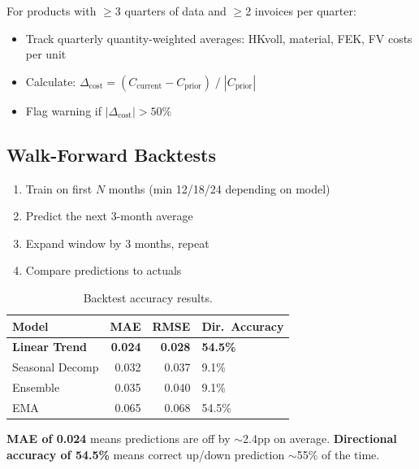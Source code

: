 \documentclass[11pt,a4paper]{article}
\newcommand{\pp}{pp}
\begin{document}
For products with $\geq$3 quarters of data and $\geq$2 invoices per quarter:
\begin{itemize}[nosep]
  \item Track quarterly quantity-weighted averages: HKvoll, material, FEK, FV costs per unit
  \item Calculate: $\Delta_{\text{cost}} = (C_{\text{current}} - C_{\text{prior}}) \;/\; |C_{\text{prior}}|$
  \item Flag warning if $|\Delta_{\text{cost}}| > 50\%$
\end{itemize}

\subsection{Walk-Forward Backtests}

\begin{enumerate}[nosep]
  \item Train on first $N$ months (min 12/18/24 depending on model)
  \item Predict the next 3-month average
  \item Expand window by 3 months, repeat
  \item Compare predictions to actuals
\end{enumerate}

\begin{table}[H]
\centering
\begin{tabular}{lrrl}
\toprule
\textbf{Model} & \textbf{MAE} & \textbf{RMSE} & \textbf{Dir.\ Accuracy} \\
\midrule
\textbf{Linear Trend} & \textbf{0.024} & \textbf{0.028} & \textbf{54.5\%} \\
Seasonal Decomp       & 0.032          & 0.037          & 9.1\% \\
Ensemble              & 0.035          & 0.040          & 9.1\% \\
EMA                   & 0.065          & 0.068          & 54.5\% \\
\bottomrule
\end{tabular}
\caption{Backtest accuracy results.}
\end{table}

\textbf{MAE of 0.024} means predictions are off by $\sim$2.4\pp{} on average. \textbf{Directional accuracy of 54.5\%} means correct up/down prediction $\sim$55\% of the time.

\end{document}
